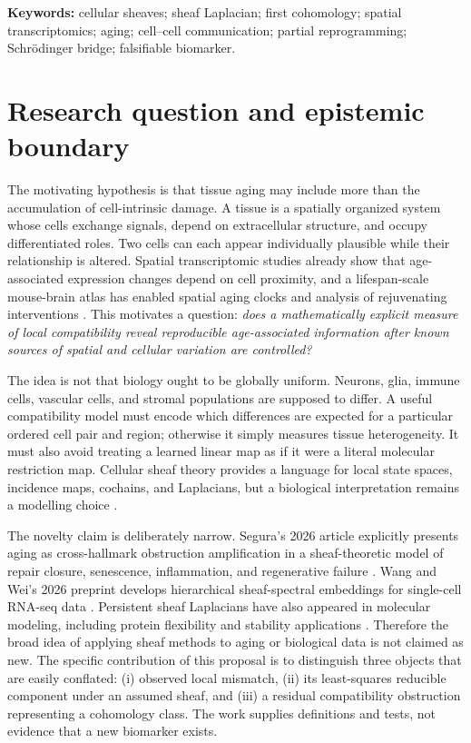 \documentclass[11pt]{article}
\begin{document}
\noindent\textbf{Keywords:} cellular sheaves; sheaf Laplacian; first cohomology; spatial transcriptomics; aging; cell--cell communication; partial reprogramming; Schr\"odinger bridge; falsifiable biomarker.

\section{Research question and epistemic boundary}
The motivating hypothesis is that tissue aging may include more than the accumulation of cell-intrinsic damage. A tissue is a spatially organized system whose cells exchange signals, depend on extracellular structure, and occupy differentiated roles. Two cells can each appear individually plausible while their relationship is altered. Spatial transcriptomic studies already show that age-associated expression changes depend on cell proximity, and a lifespan-scale mouse-brain atlas has enabled spatial aging clocks and analysis of rejuvenating interventions \cite{sun2025,wu2024}. This motivates a question: \emph{does a mathematically explicit measure of local compatibility reveal reproducible age-associated information after known sources of spatial and cellular variation are controlled?}

The idea is not that biology ought to be globally uniform. Neurons, glia, immune cells, vascular cells, and stromal populations are supposed to differ. A useful compatibility model must encode which differences are expected for a particular ordered cell pair and region; otherwise it simply measures tissue heterogeneity. It must also avoid treating a learned linear map as if it were a literal molecular restriction map. Cellular sheaf theory provides a language for local state spaces, incidence maps, cochains, and Laplacians, but a biological interpretation remains a modelling choice \cite{hansen2019}.

The novelty claim is deliberately narrow. Segura's 2026 article explicitly presents aging as cross-hallmark obstruction amplification in a sheaf-theoretic model of repair closure, senescence, inflammation, and regenerative failure \cite{segura2026}. Wang and Wei's 2026 preprint develops hierarchical sheaf-spectral embeddings for single-cell RNA-seq data \cite{wangwei2026}. Persistent sheaf Laplacians have also appeared in molecular modeling, including protein flexibility and stability applications \cite{hayes2025,ren2026}. Therefore the broad idea of applying sheaf methods to aging or biological data is not claimed as new. The specific contribution of this proposal is to distinguish three objects that are easily conflated: (i) observed local mismatch, (ii) its least-squares reducible component under an assumed sheaf, and (iii) a residual compatibility obstruction representing a cohomology class. The work supplies definitions and tests, not evidence that a new biomarker exists.
\end{document}
